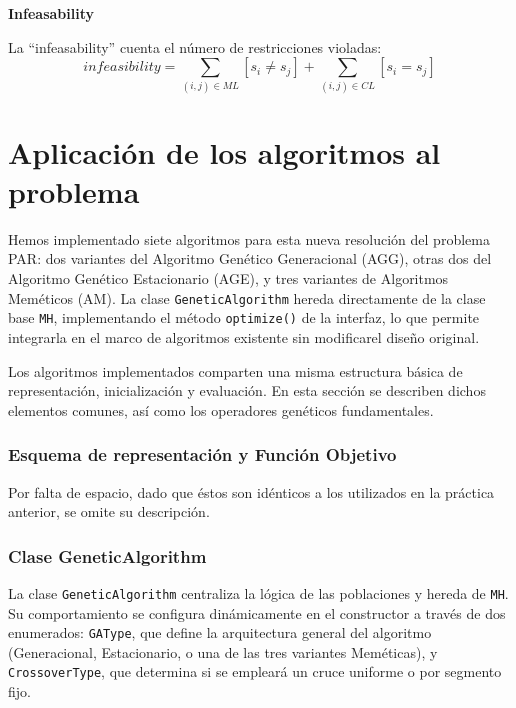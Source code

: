\documentclass[a4paper,12pt]{article}%
\begin{document}
\vspace{0.1cm}
\noindent\textbf{Infeasability}

La ``infeasability'' cuenta el número de restricciones violadas:
\begin{equation*}
	infeasibility = \sum_{(i,j) \in ML} [s_i \neq s_j] + \sum_{(i,j) \in CL} [s_i = s_j]
\end{equation*}



\newpage
\section{Aplicación de los algoritmos al problema}

\noindent Hemos implementado siete algoritmos para esta nueva resolución del problema PAR: dos variantes del Algoritmo Genético Generacional (AGG), otras dos del Algoritmo Genético Estacionario (AGE), y tres variantes de Algoritmos Meméticos (AM). La clase \texttt{GeneticAlgorithm} hereda directamente de la clase base \texttt{MH}, implementando el método \texttt{optimize()} de la interfaz, lo que permite integrarla en el marco de algoritmos existente sin modificarel diseño original.

Los algoritmos implementados comparten una misma estructura básica de representación, inicialización y evaluación. En esta sección se describen dichos elementos comunes, así como los operadores genéticos fundamentales.

\subsubsection*{Esquema de representación y Función Objetivo}
\noindent Por falta de espacio, dado que éstos son idénticos a los utilizados en la práctica anterior, se omite su descripción.


\subsubsection*{Clase GeneticAlgorithm}

\noindent La clase \texttt{GeneticAlgorithm} centraliza la lógica de las poblaciones y hereda de \texttt{MH}. Su comportamiento se configura dinámicamente en el constructor a través de dos enumerados: \texttt{GAType}, que define la arquitectura general del algoritmo (Generacional, Estacionario, o una de las tres variantes Meméticas), y \texttt{CrossoverType}, que determina si se empleará un cruce uniforme o por segmento fijo. 
\end{document}
